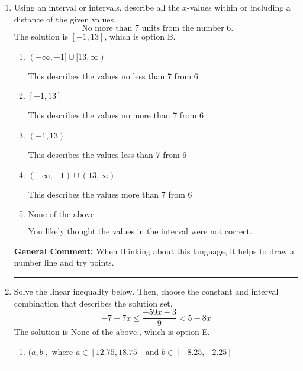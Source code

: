 \documentclass{extbook}[14pt]
\newcommand{\litem}[1]{\item #1

\rule{\textwidth}{0.4pt}}
\begin{document}
\begin{enumerate}
{\begin{enumerate}[label=\Alph*.]
 $(-\infty, 0.111]$, which corresponds to negating the endpoint of the solution.
\item \( [a, \infty), \text{ where } a \in [-0.03, 0.27] \)

 $[0.111, \infty)$, which corresponds to switching the direction of the interval AND negating the endpoint. You likely did this if you did not flip the inequality when dividing by a negative as well as not moving values over to a side properly.
\item \( [a, \infty), \text{ where } a \in [-0.23, -0.1] \)

 $[-0.111, \infty)$, which corresponds to switching the direction of the interval. You likely did this if you did not flip the inequality when dividing by a negative!
\item \( \text{None of the above}. \)

You may have chosen this if you thought the inequality did not match the ends of the intervals.
\end{enumerate}

\textbf{General Comment:} Remember that less/greater than or equal to includes the endpoint, while less/greater do not. Also, remember that you need to flip the inequality when you multiply or divide by a negative.
}
\litem{
Using an interval or intervals, describe all the $x$-values within or including a distance of the given values.
\[ \text{ No more than } 7 \text{ units from the number } 6. \]The solution is \( [-1, 13] \), which is option B.\begin{enumerate}[label=\Alph*.]
\item \( (-\infty, -1] \cup [13, \infty) \)

This describes the values no less than 7 from 6
\item \( [-1, 13] \)

This describes the values no more than 7 from 6
\item \( (-1, 13) \)

This describes the values less than 7 from 6
\item \( (-\infty, -1) \cup (13, \infty) \)

This describes the values more than 7 from 6
\item \( \text{None of the above} \)

You likely thought the values in the interval were not correct.
\end{enumerate}

\textbf{General Comment:} When thinking about this language, it helps to draw a number line and try points.
}
\litem{
Solve the linear inequality below. Then, choose the constant and interval combination that describes the solution set.
\[ -7 - 7 x \leq \frac{-59 x - 3}{9} < 5 - 8 x \]The solution is \( \text{None of the above.} \), which is option E.\begin{enumerate}[label=\Alph*.]
\item \( (a, b], \text{ where } a \in [12.75, 18.75] \text{ and } b \in [-8.25, -2.25] \)


\end{enumerate}}
\end{enumerate}
\end{document}
